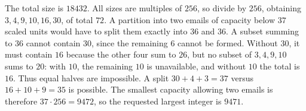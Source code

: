 The total size is $18432$. All sizes are multiples of $256$, so divide by $256$, obtaining $3,4,9,10,16,30$, of total $72$. A partition into two emails of capacity below $37$ scaled units would have to split them exactly into $36$ and $36$. A subset summing to $36$ cannot contain $30$, since the remaining $6$ cannot be formed. Without $30$, it must contain $16$ because the other four sum to $26$, but no subset of $3,4,9,10$ sums to $20$: with $10$, the remaining $10$ is unavailable, and without $10$ the total is $16$. Thus equal halves are impossible. A split $30+4+3=37$ versus $16+10+9=35$ is possible. The smallest capacity allowing two emails is therefore $37\cdot256=9472$, so the requested largest integer is $\boxed{9471}$.
